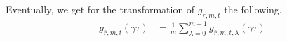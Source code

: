 \documentclass{article}
\begin{document}
Eventually, we get for the transformation of $g_{\bar{r},m,t}$ the
following.
\begin{align}
  g_{\bar{r},m,t}(\gamma\tau)
  &=
  \frac{1}{m} \sum_{\lambda=0}^{m-1} g_{\bar{r},m,t,\lambda}(\gamma\tau)
  \label{eq:g_rbar-m-t(gamma*tau)}
\end{align}







\printindex
\end{document}
